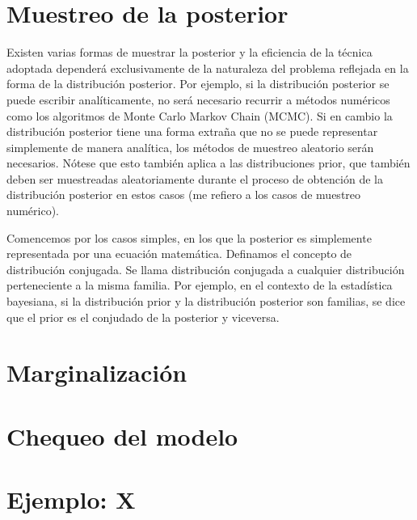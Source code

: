 \documentclass[a4paper,twoside]{article}
\begin{document}

\section{Muestreo de la posterior}
%
Existen varias formas de muestrar la posterior y la eficiencia de la técnica adoptada dependerá
exclusivamente de la naturaleza del problema reflejada en la forma de la distribución posterior. Por
ejemplo, si la distribución posterior se puede escribir analíticamente, no será necesario recurrir a
métodos numéricos como los algoritmos de Monte Carlo Markov Chain (MCMC). Si en cambio la
distribución posterior tiene una forma extraña que no se puede representar simplemente de manera
analítica, los métodos de muestreo aleatorio serán necesarios. Nótese que esto también aplica a las
distribuciones prior, que también deben ser muestreadas aleatoriamente durante el proceso de
obtención de la distribución posterior en estos casos (me refiero a los casos de muestreo numérico).

Comencemos por los casos simples, en los que la posterior es simplemente representada por una
ecuación matemática. Definamos el concepto de distribución conjugada. Se llama distribución
conjugada a cualquier distribución perteneciente a la misma familia. Por ejemplo, en el contexto de
la estadística bayesiana, si la distribución prior y la distribución posterior son familias, se dice
que el prior es el conjudado de la posterior y viceversa.


\section{Marginalización}


\section{Chequeo del modelo}


\section{Ejemplo: X}
\end{document}
